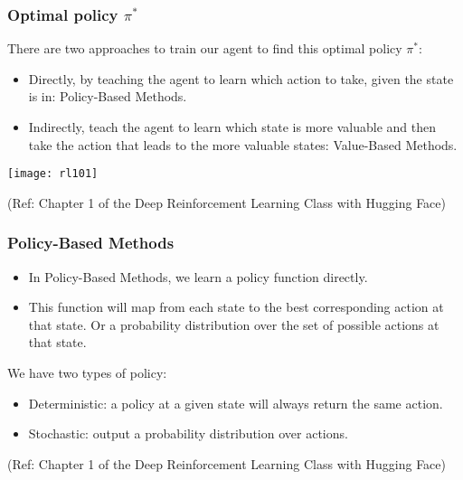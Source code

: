 \begin{frame}[fragile]\frametitle{Optimal policy $\pi^*$}

There are two approaches to train our agent to find this optimal policy  $\pi^*$:

\begin{itemize}
\item Directly, by teaching the agent to learn which action to take, given the state is in: Policy-Based Methods.
\item Indirectly, teach the agent to learn which state is more valuable and then take the action that leads to the more valuable states: Value-Based Methods.
\end{itemize}

\begin{center}
\texttt{[image: rl101]}
\end{center}



{\tiny (Ref: Chapter 1 of the Deep Reinforcement Learning Class with Hugging Face)}


\end{frame}

\begin{frame}[fragile]\frametitle{Policy-Based Methods}

\begin{itemize}
\item In Policy-Based Methods, we learn a policy function directly.
\item This function will map from each state to the best corresponding action at that state. Or a probability distribution over the set of possible actions at that state.
\end{itemize}

We have two types of policy:
\begin{itemize}
\item Deterministic: a policy at a given state will always return the same action.
\item Stochastic: output a probability distribution over actions.
\end{itemize}

{\tiny (Ref: Chapter 1 of the Deep Reinforcement Learning Class with Hugging Face)}


\end{frame}

